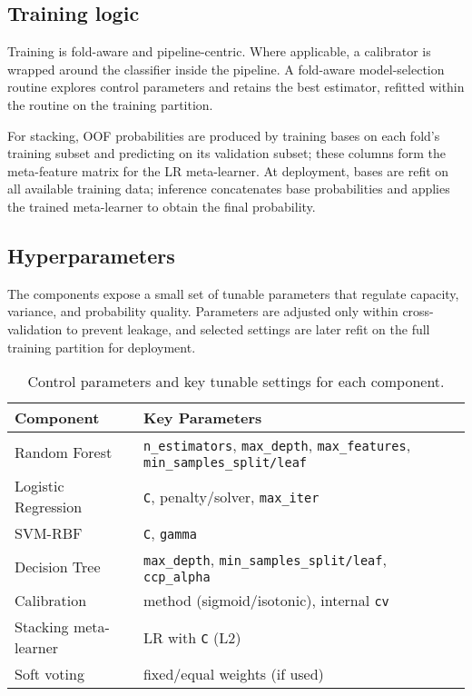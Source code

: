 \documentclass[conference]{IEEEtran}
\begin{document}
\subsection{Training logic}
Training is fold-aware and pipeline-centric. Where applicable, a calibrator is wrapped around the classifier inside the pipeline. A fold-aware model-selection routine explores control parameters and retains the best estimator, refitted within the routine on the training partition.

For stacking, OOF probabilities are produced by training bases on each fold’s training subset and predicting on its validation subset; these columns form the meta-feature matrix for the LR meta-learner. At deployment, bases are refit on all available training data; inference concatenates base probabilities and applies the trained meta-learner to obtain the final probability.

\subsection{Hyperparameters}
The components expose a small set of tunable parameters that regulate capacity, variance, and probability quality. Parameters are adjusted only within cross-validation to prevent leakage, and selected settings are later refit on the full training partition for deployment.

\begin{table}[h]
\centering
\small
\caption{Control parameters and key tunable settings for each component.}
\label{tab:control-parameters}
\begin{tabular}{p{3.1cm} p{4.2cm}}
\toprule
\textbf{Component} & \textbf{Key Parameters} \\
\midrule
Random Forest & \texttt{n\_estimators}, \texttt{max\_depth}, \texttt{max\_features}, \texttt{min\_samples\_split/leaf} \\
Logistic Regression & \texttt{C}, penalty/solver, \texttt{max\_iter} \\
SVM-RBF & \texttt{C}, \texttt{gamma} \\
Decision Tree & \texttt{max\_depth}, \texttt{min\_samples\_split/leaf}, \texttt{ccp\_alpha} \\
Calibration & method (sigmoid/isotonic), internal \texttt{cv} \\
Stacking meta-learner & LR with \texttt{C} (L2) \\
Soft voting & fixed/equal weights (if used) \\
\bottomrule
\end{tabular}
\end{table}
\end{document}
